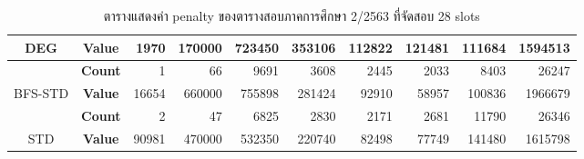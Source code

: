 \begin{table}[]
{\begin{tabular}{@{}ccrrrrrrrr@{}}
    \multirow{-2}{*}{{\color[HTML]{FE0000} DEG}} & {\color[HTML]{FE0000} \textbf{Value}} & {\color[HTML]{FE0000} 1970} & {\color[HTML]{FE0000} 170000} & {\color[HTML]{FE0000} 723450} & {\color[HTML]{FE0000} 353106} & {\color[HTML]{FE0000} 112822} & {\color[HTML]{FE0000} 121481} & {\color[HTML]{FE0000} 111684} & {\color[HTML]{FE0000} 1594513} \\ \midrule
                                                 & \textbf{Count}                        & 1                           & 66                            & 9691                          & 3608                          & 2445                          & 2033                          & 8403                          & 26247                          \\ \cmidrule(l){2-10} 
    \multirow{-2}{*}{BFS-STD}                    & \textbf{Value}                        & 16654                       & 660000                        & 755898                        & 281424                        & 92910                         & 58957                         & 100836                        & 1966679                        \\ \midrule
                                                 & \textbf{Count}                        & 2                           & 47                            & 6825                          & 2830                          & 2171                          & 2681                          & 11790                         & 26346                          \\ \cmidrule(l){2-10} 
    \multirow{-2}{*}{STD}                        & \textbf{Value}                        & 90981                       & 470000                        & 532350                        & 220740                        & 82498                         & 77749                         & 141480                        & 1615798                        \\ \bottomrule
    \end{tabular}%
    }
    \caption{ตารางแสดงค่า penalty ของตารางสอบภาคการศึกษา 2/2563 ที่จัดสอบ 28 slots}
    \label{tab:result_table_263_28}
\end{table}